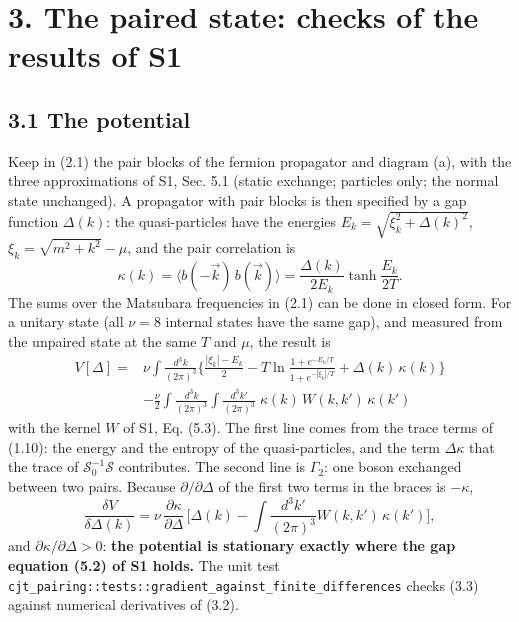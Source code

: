 \documentclass[
  10pt,
]{article}
\begin{document}
\hypertarget{the-paired-state-checks-of-the-results-of-s1}{%
\section{3. The paired state: checks of the results of
S1}\label{the-paired-state-checks-of-the-results-of-s1}}

\hypertarget{the-potential}{%
\subsection{3.1 The potential}\label{the-potential}}

Keep in (2.1) the pair blocks of the fermion propagator and diagram (a),
with the three approximations of S1, Sec. 5.1 (static exchange;
particles only; the normal state unchanged). A propagator with pair
blocks is then specified by a gap function \(\Delta(k)\): the
quasi-particles have the energies \(E_k=\sqrt{\xi_k^2+\Delta(k)^2}\),
\(\xi_k=\sqrt{m^2+k^2}-\mu\), and the pair correlation is
\[\kappa(k)=\langle b(-\vec k)\,b(\vec k)\rangle=\frac{\Delta(k)}{2E_k}\tanh\frac{E_k}{2T}.\tag{3.1}\]
The sums over the Matsubara frequencies in (2.1) can be done in closed
form. For a unitary state (all \(\nu=8\) internal states have the same
gap), and measured from the unpaired state at the same \(T\) and
\(\mu\), the result is
\[\boxed{\;\begin{aligned}V[\Delta]={}&\nu\!\int\!\!\frac{d^3k}{(2\pi)^3}\Big\{\frac{|\xi_k|-E_k}{2}-T\ln\frac{1+e^{-E_k/T}}{1+e^{-|\xi_k|/T}}+\Delta(k)\,\kappa(k)\Big\}\\
&-\frac\nu2\int\!\!\frac{d^3k}{(2\pi)^3}\!\int\!\!\frac{d^3k'}{(2\pi)^3}\;\kappa(k)\,W(k,k')\,\kappa(k')\end{aligned}\;}\tag{3.2}\]
with the kernel \(W\) of S1, Eq. (5.3). The first line comes from the
trace terms of (1.10): the energy and the entropy of the
quasi-particles, and the term \(\Delta\kappa\) that the trace of
\(\mathcal S_0^{-1}\mathcal S\) contributes. The second line is
\(\Gamma_2\): one boson exchanged between two pairs. Because
\(\partial/\partial\Delta\) of the first two terms in the braces is
\(-\kappa\),
\[\frac{\delta V}{\delta\Delta(k)}=\nu\,\frac{\partial\kappa}{\partial\Delta}\,\Big[\Delta(k)-\int\!\!\frac{d^3k'}{(2\pi)^3}W(k,k')\,\kappa(k')\Big],\tag{3.3}\]
and \(\partial\kappa/\partial\Delta>0\): \textbf{the potential is
stationary exactly where the gap equation (5.2) of S1 holds.} The unit
test
\texttt{cjt\_pairing::tests::gradient\_against\_finite\_differences}
checks (3.3) against numerical derivatives of (3.2).
\end{document}
